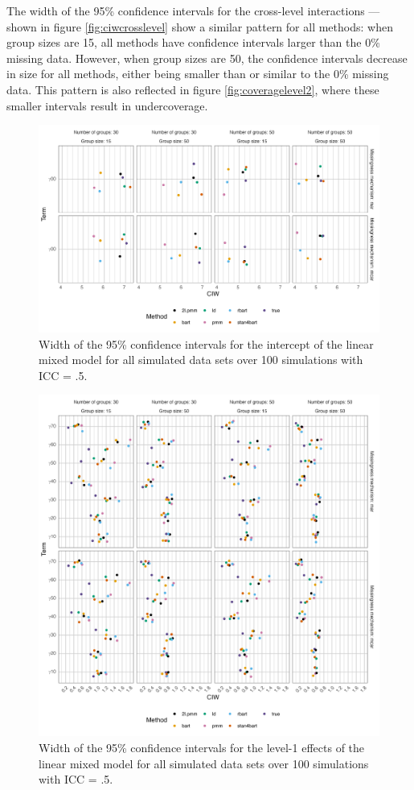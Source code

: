 \documentclass[10pt, a4paper, titlepage]{article}
\begin{document}
The width of the 95\% confidence intervals for the cross-level interactions --- shown in figure \ref{fig:ciwcrosslevel} show a similar pattern for all methods: when group sizes are 15, all methods have confidence intervals larger than the 0\% missing data. However, when group sizes are 50, the confidence intervals decrease in size for all methods, either being smaller than or similar to the 0\% missing data. This pattern is also reflected in figure \ref{fig:coveragelevel2}, where these smaller intervals result in undercoverage.

\begin{figure}[H]
    \centering
    \includegraphics[width=1\textwidth]{ciwintercept.png}
    \caption{Width of the 95\% confidence intervals for the intercept of the linear mixed model for all simulated data sets over 100 simulations with ICC = .5.}
    \label{fig:ciwintercept}
\end{figure}

\begin{figure}[H]
    \centering
    \includegraphics[width=1\textwidth]{ciwlevel1.png}
    \caption{Width of the 95\% confidence intervals for the level-1 effects of the linear mixed model for all simulated data sets over 100 simulations with ICC = .5.}
    \label{fig:ciwlevel1}
\end{figure}
\end{document}
